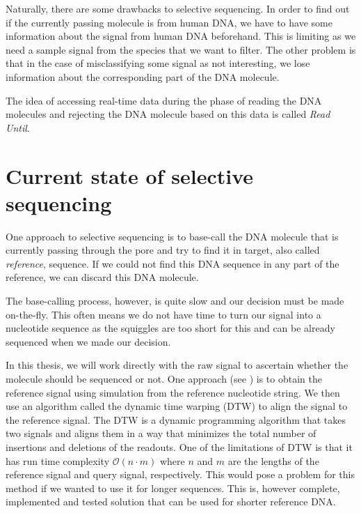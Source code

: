 Naturally, there are some drawbacks to selective sequencing. In order to find out
if the currently passing molecule is from human DNA, we have to have some information
about the signal from human DNA beforehand. This is limiting as we need a sample signal from
the species that we want to filter. The other problem is that in the case of misclassifying
some signal as not interesting, we lose information about the corresponding
part of the DNA molecule.

The idea of accessing real-time data during the phase of reading the DNA molecules
and rejecting the DNA molecule based on this data is called \textit{Read Until}. 

\section{Current state of selective sequencing}
\label{section:currState}


One approach to selective sequencing is to base-call the DNA molecule that is
currently passing through the pore and try to find it in target, also called \textit{reference}, sequence.
If we could not find this DNA sequence in any part of the reference, we can discard this DNA molecule.

The base-calling process, however, is quite slow and our decision must be made on-the-fly.
This often means we do not have time to turn our signal into a nucleotide sequence
as the squiggles are too short for this and can be already sequenced when we made our decision.

In this thesis, we will work directly with the raw signal to ascertain whether the molecule
should be sequenced or not. One approach (see \cite{loose2016real}) is to obtain the reference signal using
simulation from the reference nucleotide string. We then use an algorithm called
the dynamic time warping (DTW) to align the signal to the reference signal.
The DTW is a dynamic programming algorithm that takes two signals and aligns them in a
way that minimizes the total number of insertions and deletions of the readouts. One of the limitations
of DTW is that it has run time complexity $\mathcal{O}(n\cdot m)$ where $n$ and $m$
are the lengths of the reference signal and query signal, respectively. This would pose a problem
for this method if we wanted to use it for longer sequences. This is, however complete,
implemented and tested solution that can be used for shorter reference DNA.


